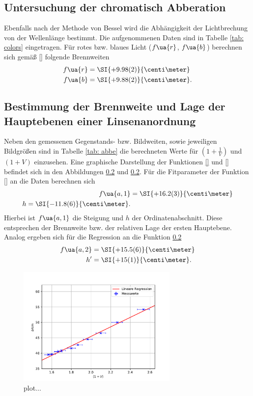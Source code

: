 \subsection{Untersuchung der chromatisch Abberation}
Ebenfalls nach der Methode von Bessel wird die Abhängigkeit der Lichtbrechung von der Wellenlänge bestimmt. Die aufgenommenen
Daten sind in Tabelle \ref{tab: colors} eingetragen. Für rotes bzw. blaues Licht ($f\ua{r}$, $f\ua{b}$) berechnen sich gemäß \eqref{}
folgende Brennweiten
\begin{align}
  f\ua{r} &= \SI{+9.98(2)}{\centi\meter} \label{eq: f_rot}\\
  f\ua{b} &= \SI{+9.88(2)}{\centi\meter}. \label{eq: f_rot}
\end{align}


\subsection{Bestimmung der Brennweite und Lage der Hauptebenen einer Linsenanordnung}
Neben den gemessenen Gegenstands- bzw. Bildweiten, sowie jeweiligen Bildgrößen sind in Tabelle \ref{tab: abbe} die
berechneten Werte für $(1 + \frac{1}{V})$ und $(1 + V)$ einzusehen. Eine graphische Darstellung der Funktionen \eqref{}
und \eqref{} befindet sich in den Abbildungen \ref{} und \ref{}. Für die Fitparameter der Funktion \eqref{} an die Daten
berechnen sich
\begin{align}
  f\ua{a, 1} &= \SI{+16.2(3)}{\centi\meter} \\
  h = \SI{-11.8(6)}{\centi\meter}.
\end{align}
Hierbei ist $f\ua{a, 1}$ die Steigung und $h$ der Ordinatenabschnitt.
Diese entsprechen der Brennweite bzw. der relativen Lage der ersten Hauptebene. Analog ergeben sich für die Regression an
die Funktion \ref{}
\begin{align}
  f\ua{a, 2} &= \SI{+15.5(6)}{\centi\meter} \\
  h' &= \SI{+15(1)}{\centi\meter}.
\end{align}

\begin{figure}
  \centering
  \includegraphics[width = 0.7\textwidth]{../Messdaten/plots/abbe_plot_b.pdf}
  \caption{plot...}
  \label{fig: abbe_b}
\end{figure}

